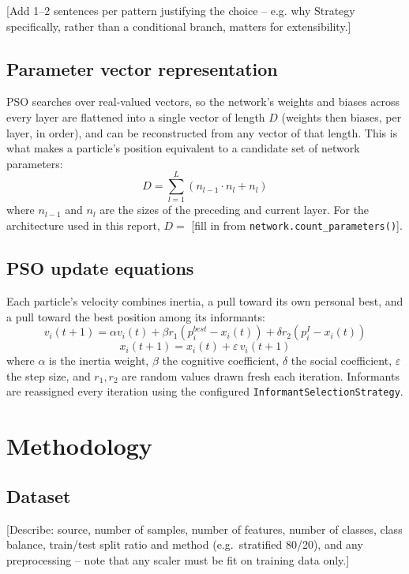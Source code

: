 \documentclass[conference]{IEEEtran}
\begin{document}
[Add 1--2 sentences per pattern justifying the choice -- e.g. why Strategy
specifically, rather than a conditional branch, matters for extensibility.]

\subsection{Parameter vector representation}
PSO searches over real-valued vectors, so the network's weights and biases
across every layer are flattened into a single vector of length $D$
(weights then biases, per layer, in order), and can be reconstructed from
any vector of that length. This is what makes a particle's position
equivalent to a candidate set of network parameters:
\begin{equation}
D = \sum_{l=1}^{L} \left( n_{l-1} \cdot n_l + n_l \right)
\label{eq:dimension}
\end{equation}
where $n_{l-1}$ and $n_l$ are the sizes of the preceding and current layer.
For the architecture used in this report, $D = $ [fill in from
\texttt{network.count\_parameters()}].

\subsection{PSO update equations}
Each particle's velocity combines inertia, a pull toward its own personal
best, and a pull toward the best position among its informants:
\begin{equation}
v_i(t\!+\!1) = \alpha v_i(t) + \beta r_1 (p_i^{best} - x_i(t)) +
\delta r_2 (p_i^{I} - x_i(t))
\label{eq:velocity}
\end{equation}
\begin{equation}
x_i(t+1) = x_i(t) + \varepsilon \, v_i(t+1)
\label{eq:position}
\end{equation}
where $\alpha$ is the inertia weight, $\beta$ the cognitive coefficient,
$\delta$ the social coefficient, $\varepsilon$ the step size, and $r_1,
r_2$ are random values drawn fresh each iteration. Informants are
reassigned every iteration using the configured
\texttt{InformantSelectionStrategy}.

\section{Methodology}

\subsection{Dataset}
[Describe: source, number of samples, number of features, number of
classes, class balance, train/test split ratio and method (e.g.\ stratified
80/20), and any preprocessing -- note that any scaler must be fit on
training data only.]
\end{document}
